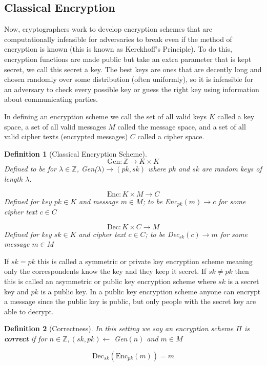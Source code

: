 \documentclass[12pt,twoside]{reedthesis}
\newtheorem{definition}{Definition}
\begin{document}
    \subsection{Classical Encryption}
    Now, cryptographers work to develop encryption schemes that are computationally infeasible for adversaries to break even if the method of encryption is known (this is known as Kerckhoff's Principle). To do this, encryption functions are made public but take an extra parameter that is kept secret, we call this secret a key. The best keys are ones that are decently long and chosen randomly over some distribution (often uniformly), so it is infeasible for an adversary to check every possible key or guess the right key using information about communicating parties.
       \par In defining an encryption scheme we call the set of all valid keys $K$ called a key space, a set of all valid messages $M$ called the message space, and a set of all valid cipher texts (encrypted messages) $C$ called a cipher space.

\begin{definition}[Classical Encryption Scheme]
     
 
 $$\text{Gen}:\mathbb{Z} \rightarrow K \times K$$
 Defined to be for $\lambda \in \mathbb{Z}$, Gen($\lambda ) \rightarrow (pk,sk)$ where $pk$ and $sk$ are random keys of length $\lambda$.
 
  $$\text{Enc}:K \times M \rightarrow C$$
Defined for key $pk\in K$ and message $m\in M$; to be Enc$_{pk}(m) \rightarrow c$ for some cipher text $c\in C$
 
 $$\text{Dec}:K \times C \rightarrow M$$
 Defined for key $sk \in K$ and cipher text $c\in C$; to be Dec$_{sk}(c) \rightarrow m$ for some message $m\in M$
 
 \end{definition}
 
 
\par If $sk = pk$ this is called a symmetric or private key encryption scheme meaning only the correspondents know the key and they keep it secret. If $sk \not= pk$ then this is called an asymmetric or public key encryption scheme where $sk$ is a secret key and $pk$ is a public key. In a public key encryption scheme anyone can encrypt a message since the public key is public, but only people with the secret key are able to decrypt.


\begin{definition}[Correctness]
In this setting we say an encryption scheme $\Pi$ is \textbf{correct} if for $n\in \mathbb{Z} , (sk,pk) \leftarrow$ Gen$(n)$ and $m\in M$ 

$$\text{Dec}_{sk}(\text{Enc}_{pk}(m)) = m$$
\end{definition}
\end{document}
